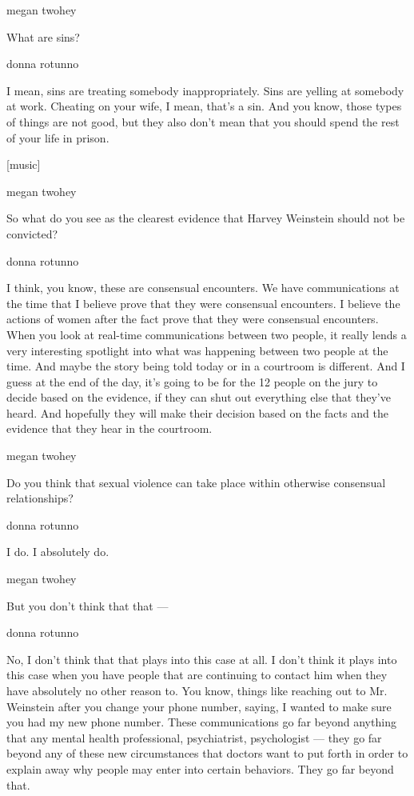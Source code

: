 megan twohey

What are sins?

donna rotunno

I mean, sins are treating somebody inappropriately. Sins are yelling at
somebody at work. Cheating on your wife, I mean, that's a sin. And you
know, those types of things are not good, but they also don't mean that
you should spend the rest of your life in prison.

{[}music{]}

megan twohey

So what do you see as the clearest evidence that Harvey Weinstein should
not be convicted?

donna rotunno

I think, you know, these are consensual encounters. We have
communications at the time that I believe prove that they were
consensual encounters. I believe the actions of women after the fact
prove that they were consensual encounters. When you look at real-time
communications between two people, it really lends a very interesting
spotlight into what was happening between two people at the time. And
maybe the story being told today or in a courtroom is different. And I
guess at the end of the day, it's going to be for the 12 people on the
jury to decide based on the evidence, if they can shut out everything
else that they've heard. And hopefully they will make their decision
based on the facts and the evidence that they hear in the courtroom.

megan twohey

Do you think that sexual violence can take place within otherwise
consensual relationships?

donna rotunno

I do. I absolutely do.

megan twohey

But you don't think that that ---

donna rotunno

No, I don't think that that plays into this case at all. I don't think
it plays into this case when you have people that are continuing to
contact him when they have absolutely no other reason to. You know,
things like reaching out to Mr. Weinstein after you change your phone
number, saying, I wanted to make sure you had my new phone number. These
communications go far beyond anything that any mental health
professional, psychiatrist, psychologist --- they go far beyond any of
these new circumstances that doctors want to put forth in order to
explain away why people may enter into certain behaviors. They go far
beyond that.

